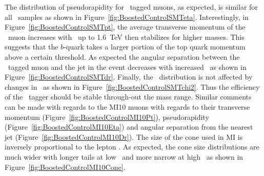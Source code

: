 The distribution of pseudorapidity for \xsm\ tagged muons, as expected, is similar for all \mzp\ samples as shown in Figure~\ref{fig:BoostedControlSMTeta}. Interestingly, in Figure~\ref{fig:BoostedControlSMTpt}, the average transverse momentum of the \xsm\ muon increases with \mzp\ up to \SI{1.6}{\TeV} then stabilizes for higher masses. This suggests that the $b$-quark takes a larger portion of the top quark momentum above a certain threshold. As expected the angular separation between the \xsm\ tagged muon and the jet in the event decreases with increased \mzp\ as shown in Figure~\ref{fig:BoostedControlSMTdr}. Finally, the \xsd\ distribution is not affected by changes in \mzp\ as shown in Figure~\ref{fig:BoostedControlSMTchi2}. Thus the efficiency of the \xsm\ tagger should be stable through-out the mass range. Similar comments can be made with regards to the MI10 muons with regards to their transverse momentum (Figure~\ref{fig:BoostedControlMI10Pt}), pseudorapidity (Figure~\ref{fig:BoostedControlMI10Eta}) and angular separation from the nearest jet (Figure~\ref{fig:BoostedControlMI10Dr}). The size of the cone used in MI is inversely proportional to the lepton \pt. As expected, the cone size distributions are much wider with longer tails at low \mzp\ and more narrow at high \mzp\ as shown in Figure~\ref{fig:BoostedControlMI10Cone}. 

